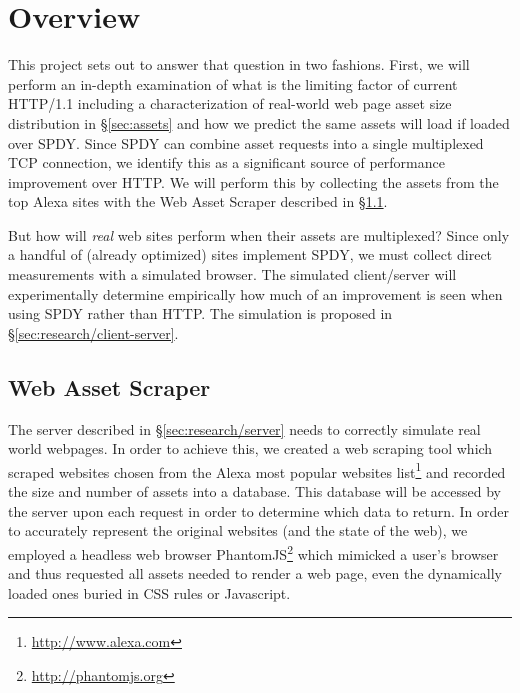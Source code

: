 \documentclass[10pt,letterpaper,notitlepage]{article}
\begin{document}
\section{Overview}
\label{sec:research/overview}
This project sets out to answer that question in two fashions. First, we will
perform an in-depth examination of what is the limiting factor of current
HTTP/1.1 including a characterization of real-world web page asset size
distribution in \S\ref{sec:assets} and how we predict the same assets will load
if loaded over SPDY. Since SPDY can combine asset requests into a single
multiplexed TCP connection, we identify this as a significant source of
performance improvement over HTTP. We will perform this by collecting the
assets from the top Alexa sites with the Web Asset Scraper described in
\S\ref{sec:research/scraper}.

But how will \textit{real} web sites perform when their assets are multiplexed?
Since only a handful of (already optimized) sites implement SPDY, we must
collect direct measurements with a simulated browser. The simulated
client/server will experimentally determine empirically how much of an
improvement is seen when using SPDY rather than HTTP.  The simulation is
proposed in \S\ref{sec:research/client-server}.

\subsection{Web Asset Scraper}
\label{sec:research/scraper}
The server described in \S\ref{sec:research/server} needs to correctly simulate
real world webpages. In order to achieve this, we created a web scraping tool
which scraped websites chosen from the Alexa most popular websites
list\footnote{\url{http://www.alexa.com}} and recorded the size and number of
assets into a database.  This database will be accessed by the server upon each
request in order to determine which data to return.  In order to accurately
represent the original websites (and the state of the web), we employed a
headless web browser PhantomJS\footnote{\url{http://phantomjs.org}} which
mimicked a user's browser and thus requested all assets needed to render a web
page, even the dynamically loaded ones buried in CSS rules or Javascript.
\end{document}
